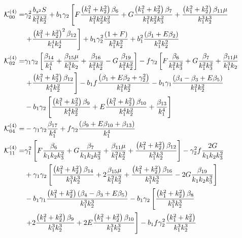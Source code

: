 \begin{align*}
\ko_{00}^{(4)}=& \gamma_2^2 \frac{b_{s^2} S}{k_1^2 k_2^2} + b_1 \gamma_2 \left[ F \frac{\left(k_1^2 + k_2^2 \right) \beta_{6}}{k_1^2 k_2^2 k_3^2} + G \frac{\left( k_1^2 + k_2^2 \right) \beta_{7}}{k_1^2 k_2^2 k_3^2} + \frac{\left( k_1^2 + k_2^2\right) \beta_{11} \mu }{k_1^3 k_2^3} \right. \\
&\left. + \frac{\left(k_1^2 + k_2^2 \right)^2 \beta_{12}}{k_1^4 k_2^4} \right] + b_1 \gamma_2^2 \frac{\left( 1 + F \right)}{k_1^2 k_2^2} + b_1^2 \frac{\left( \beta_1 + E \beta_2 \right)}{k_1^2 k_2^2}\\
\ko_{02}^{(4)}=& \gamma_1 \gamma_2 \left[ \frac{\beta_{14}}{k_1^4} + \frac{\beta_{15} \mu}{k_1^3 k_2} + \frac{\beta_{16}}{k_1^2 k_2^2} - G \frac{\beta_{19}}{k_1^2 k_2^2} \right] - f \gamma_2 \left[ F \frac{\beta_{6}}{k_1^2 k_3^2} + G \frac{\beta_{7}}{k_1^2 k_3^2} + \frac{\beta_{11} \mu }{k_1^3 k_2} \right. \\
&\left. + \frac{ \left( k_1^2 + k_2^2 \right) \beta_{12}}{k_1^4 k_2^2} \right] - b_1 f \frac{\left( \beta_1 + E \beta_2 + \gamma_2^2 \right)}{k_1^2 k_2^2} - b_1 \gamma_1 \frac{\left( {\beta_{4}-\beta_{3}} + E \beta_{5} \right)}{k_1^2 k_2^2} \\
&- b_1 \gamma_2 \left[ \frac{\left( k_1^2 + k_2^2 \right) \beta_{9}}{k_1^4 k_2^2} + E \frac{\left( k_1^2 + k_2^2\right) \beta_{10} }{k_1^4 k_2^2} + \frac{\beta_{13}}{k_1^4} \right] \\
\ko_{04}^{(4)}=& - \gamma_1 \gamma_2 \frac{\beta_{17}}{k_1^4} + f \gamma_2 \frac{\left( \beta_{9} + E \beta_{10} + \beta_{13} \right)}{k_1^4}\\
\ko_{11}^{(4)}=& \gamma_1^2 \left[ F \frac{\beta_{6}}{k_1 k_2 k_3^2} + G \frac{\beta_{7}}{k_1 k_2 k_3^2} + \frac{\beta_{11} \mu}{k_1^2 k_2^2} + \frac{\left( k_1^2 + k_2^2\right) \beta_{12}}{k_1^3 k_2^3} \right] - \gamma_2^2 f \frac{2 G}{k_1 k_2 k_3^2} \\
& + \gamma_1 \gamma_2 \left[ \frac{\left( k_1^2 + k_2^2 \right) \beta_{14}}{k_1^3 k_2^3} + 2 \frac{\beta_{15} \mu}{k_1^2 k_2^2} + \frac{\left( k_1^2 + k_2^2 \right) \beta_{16}}{k_1^3 k_2^3} - 2 G \frac{\beta_{19}}{k_1 k_2 k_3^2} \right] \\
&- b_1 \gamma_1 \frac{\left( k_1^2 + k_2^2\right) \left( {\beta_{4}-\beta_{3}} + E \beta_{5} \right)}{k_1^3 k_2^3} - b_1 \gamma_2 \left[ \frac{\left( k_1^2 + k_2^2 \right) \beta_{8}}{k_1^3 k_2^3} \right. \\
&\left. + 2 \frac{\left( k_1^2 + k_2^2 \right) \beta_{9}}{k_1^3 k_2^3} + 2 E \frac{\left(k_1^2 + k_2^2 \right) \beta_{10}}{k_1^3 k_2^3} \right] - b_1 f \gamma_2^2 \frac{\left( k_1^2 + k_2^2 \right)}{k_1^3 k_2^3 } \\

\end{align*}
